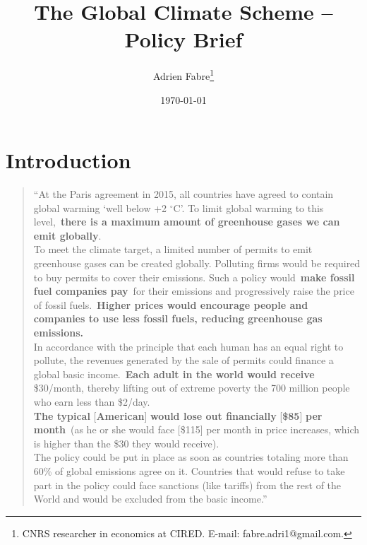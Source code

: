 \documentclass[12pt,english]{article}
\title{The Global Climate Scheme -- Policy Brief
}
\author{Adrien Fabre\footnote{CNRS researcher in economics at CIRED. E-mail: fabre.adri1@gmail.com.}}
\date{\today}
\begin{document}
\maketitle




\section{Introduction}\label{sec:intro}

\begin{quote}
  ``At the Paris agreement in 2015, all countries have agreed to contain global warming `well below +2 $\mathrm{{}^\circ}$C'. To limit global warming to this level,~\textbf{there is a maximum amount of greenhouse gases we can emit globally}.\\
  To meet the climate target, a limited number of permits to emit greenhouse gases can be created globally. Polluting firms would be required to buy permits to cover their emissions. Such a policy would~\textbf{make fossil fuel companies pay}~for their emissions and progressively raise the price of fossil fuels.~\textbf{Higher prices would encourage people and companies to use less fossil fuels, reducing greenhouse gas emissions.}\\
  In accordance with the principle that each human has an equal right to pollute, the revenues generated by the sale of permits could finance a global basic income.~\textbf{Each adult in the world would receive } \$30/month, thereby lifting out of extreme poverty the 700 million people who earn less than \$2/day.\\
  \textbf{The typical }[\textbf{American}]\textbf{ would lose out financially }[\textbf{\$85}]\textbf{ per month}~(as he or she would face [\$115] per month in price increases, which is higher than the \$30 they would receive).\\
  The policy could be put in place as soon as countries totaling more than 60\% of global emissions agree on it. Countries that would refuse to take part in the policy could face sanctions (like tariffs) from the rest of the World and would be excluded from the basic income.''
\end{quote}
\end{document}
